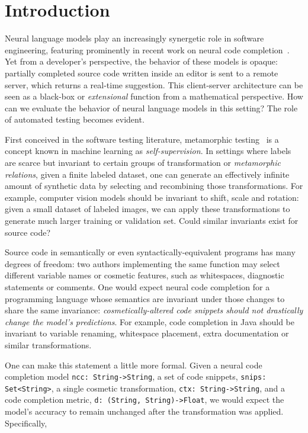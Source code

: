 \documentclass[sigconf,review,anonymous]{acmart}
\begin{document}
  \maketitle

  \section{Introduction}\label{sec:introduction}

  Neural language models play an increasingly synergetic role in software engineering, featuring prominently in recent work on neural code completion~\cite{chen2021evaluating}. Yet from a developer's perspective, the behavior of these models is opaque: partially completed source code written inside an editor is sent to a remote server, which returns a real-time suggestion. This client-server architecture can be seen as a black-box or \textit{extensional} function from a mathematical perspective. How can we evaluate the behavior of neural language models in this setting? The role of automated testing becomes evident.

  First conceived in the software testing literature, metamorphic testing~\cite{chen1995metamorphic} is a concept known in machine learning as \textit{self-supervision}. In settings where labels are scarce but invariant to certain groups of transformation or \textit{metamorphic relations}, given a finite labeled dataset, one can generate an effectively infinite amount of synthetic data by selecting and recombining those transformations. For example, computer vision models should be invariant to shift, scale and rotation: given a small dataset of labeled images, we can apply these transformations to generate much larger training or validation set. Could similar invariants exist for source code?

  Source code in semantically or even syntactically-equivalent programs has many degrees of freedom: two authors implementing the same function may select different variable names or cosmetic features, such as whitespaces, diagnostic statements or comments. One would expect neural code completion for a programming language whose semantics are invariant under those changes to share the same invariance: \textit{cosmetically-altered code snippets should not drastically change the model's predictions}. For example, code completion in Java should be invariant to variable renaming, whitespace placement, extra documentation or similar transformations.

  One can make this statement a little more formal. Given a neural code completion model \lstinline|ncc: String->String|, a set of code snippets, \lstinline|snips: Set<String>|, a single cosmetic transformation, \lstinline|ctx: String->String|, and a code completion metric, \lstinline|d: (String, String)->Float|, we would expect the model's accuracy to remain unchanged after the transformation was applied. Specifically,
\end{document}
